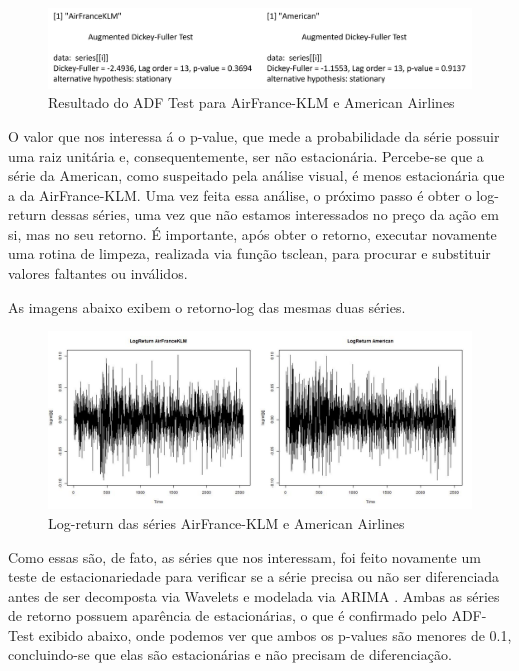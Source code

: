 \documentclass[12pt]{article}
\begin{document}
	\begin{figure}[H]
		\centering
		\includegraphics[width=0.9\linewidth]{Imagens/AdfTestWave}
		\caption{Resultado do \textrm{ADF Test} para AirFrance-KLM e American Airlines}
		\label{fig:adftestwave}
	\end{figure}
	
	O valor que nos interessa á o \textrm{p-value}, que mede a probabilidade da série possuir uma raiz unitária e, consequentemente, ser não estacionária. Percebe-se que a série da \textrm{American}, como suspeitado pela análise visual, é menos estacionária que a da \textrm{AirFrance-KLM}. Uma vez feita essa análise, o próximo passo é obter o \textrm{log-return} dessas séries, uma vez que não estamos interessados no preço da ação em si, mas no seu retorno. É importante, após obter o retorno, executar novamente uma rotina de limpeza, realizada via função \textrm{tsclean}, para procurar e substituir valores faltantes ou inválidos.
	
	As imagens abaixo exibem o retorno-log das mesmas duas séries.
	
	\begin{figure}[H]
		\centering
		\includegraphics[width=1.0\linewidth]{Imagens/LogRetWave}
		\caption{Log-return das séries AirFrance-KLM e American Airlines}
		\label{fig:logretwave}
	\end{figure}
	
	Como essas são, de fato, as séries que nos interessam, foi feito novamente um teste de estacionariedade para verificar se a série precisa ou não ser diferenciada antes de ser decomposta via \textrm{Wavelets} e modelada via ARIMA \cite{Tsay}. Ambas as séries de retorno possuem aparência de estacionárias, o que é confirmado pelo \textrm{ADF-Test} exibido abaixo, onde podemos ver que ambos os \textrm{p-values} são menores de 0.1, concluindo-se que elas são estacionárias e não precisam de diferenciação.
	
\end{document}
